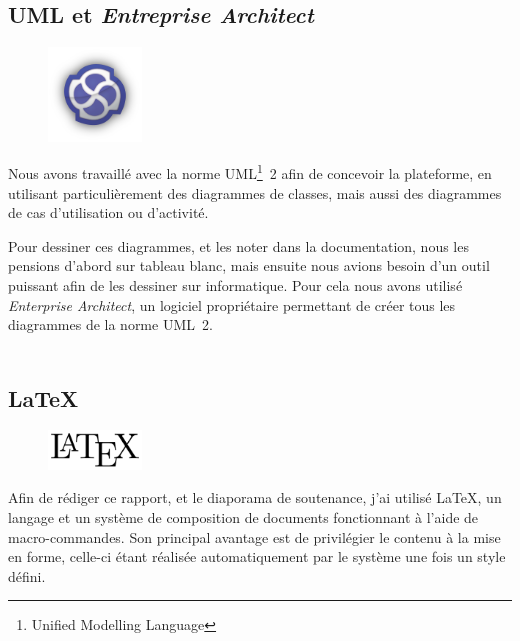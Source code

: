\subsection{UML et \textit{Entreprise Architect}}
\begin{figure}
	\includegraphics[width=2.5cm]{contents/images/logoEnterpriseArchitect.png}
\end{figure}
Nous avons travaillé avec la norme UML\footnote{Unified Modelling Language}~2 afin de concevoir la plateforme, en utilisant particulièrement des diagrammes de classes, mais aussi des diagrammes de cas d'utilisation ou d'activité. 

Pour dessiner ces diagrammes, et les noter dans la documentation, nous les pensions d'abord sur tableau blanc, mais ensuite nous avions besoin d'un outil puissant afin de les dessiner sur informatique. Pour cela nous avons utilisé \textit{Enterprise Architect}, un logiciel propriétaire permettant de créer tous les diagrammes de la norme UML~2.\\~

\subsection{\LaTeX}
\begin{figure}
	\includegraphics[width=2.5cm]{contents/images/logoLatex.png}
\end{figure}
Afin de rédiger ce rapport, et le diaporama de soutenance, j'ai utilisé \LaTeX{}, un langage et un système de composition de documents fonctionnant à l'aide de
macro-commandes. Son principal avantage est de privilégier le contenu à la mise en forme, celle-ci étant réalisée automatiquement par le système une fois un style défini. 
